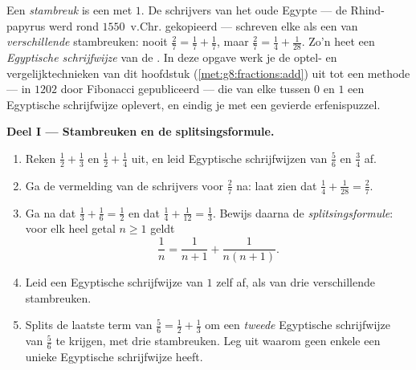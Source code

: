 \begin{problem}
\label{pb:g8:fractions:1}
Een \emph{stambreuk} is een  met  $1$. De schrijvers van het oude Egypte ---
de Rhind-papyrus werd rond $1550$~v.Chr. gekopieerd --- schreven elke  als een 
van \emph{verschillende} stambreuken: nooit $\frac27 = \frac17 + \frac17$, maar
$\frac27 = \frac14 + \frac{1}{28}$. Zo'n  heet een \emph{Egyptische schrijfwijze}
van de . In deze opgave werk je de optel- en vergelijktechnieken van dit
hoofdstuk (\cref{met:g8:fractions:add}) uit tot een methode --- in $1202$ door
Fibonacci gepubliceerd --- die van elke  tussen $0$ en $1$ een Egyptische
schrijfwijze oplevert, en eindig je met een gevierde erfenispuzzel.

\medskip
\noindent\textbf{Deel I --- Stambreuken en de splitsingsformule.}
\begin{enumerate}
  \item Reken $\frac12 + \frac13$ en $\frac12 + \frac14$ uit, en leid Egyptische
        schrijfwijzen van $\frac56$ en $\frac34$ af.
  \item Ga de vermelding van de schrijvers voor $\frac27$ na: laat zien dat
        $\frac14 + \frac{1}{28} = \frac27$.
  \item Ga na dat $\frac13 + \frac16 = \frac12$ en dat
        $\frac14 + \frac{1}{12} = \frac13$. Bewijs daarna de
        \emph{splitsingsformule}: voor elk heel getal $n \geq 1$ geldt
        \[
        \frac{1}{n} = \frac{1}{n+1} + \frac{1}{n(n+1)} .
        \]
  \item Leid een Egyptische schrijfwijze van $1$ zelf af, als  van drie
        verschillende stambreuken.
  \item Splits de laatste term van $\frac56 = \frac12 + \frac13$ om een \emph{tweede}
        Egyptische schrijfwijze van $\frac56$ te krijgen, met drie stambreuken. Leg uit
        waarom geen enkele  een unieke Egyptische schrijfwijze heeft.
\end{enumerate}


\end{problem}
